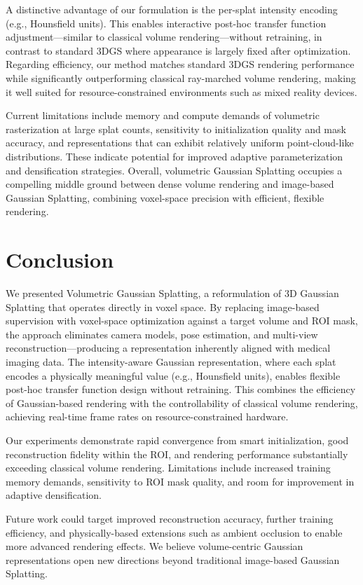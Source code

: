 \documentclass[runningheads]{llncs}
\begin{document}
A distinctive advantage of our formulation is the per-splat intensity encoding (e.g., Hounsfield units). This enables interactive post-hoc transfer function adjustment—similar to classical volume rendering—without retraining, in contrast to standard 3DGS where appearance is largely fixed after optimization. Regarding efficiency, our method matches standard 3DGS rendering performance while significantly outperforming classical ray-marched volume rendering, making it well suited for resource-constrained environments such as mixed reality devices.

Current limitations include memory and compute demands of volumetric rasterization at large splat counts, sensitivity to initialization quality and mask accuracy, and representations that can exhibit relatively uniform point-cloud-like distributions. These indicate potential for improved adaptive parameterization and densification strategies. Overall, volumetric Gaussian Splatting occupies a compelling middle ground between dense volume rendering and image-based Gaussian Splatting, combining voxel-space precision with efficient, flexible rendering.

\section{Conclusion}

We presented Volumetric Gaussian Splatting, a reformulation of 3D Gaussian Splatting that operates directly in voxel space. By replacing image-based supervision with voxel-space optimization against a target volume and ROI mask, the approach eliminates camera models, pose estimation, and multi-view reconstruction—producing a representation inherently aligned with medical imaging data. The intensity-aware Gaussian representation, where each splat encodes a physically meaningful value (e.g., Hounsfield units), enables flexible post-hoc transfer function design without retraining. This combines the efficiency of Gaussian-based rendering with the controllability of classical volume rendering, achieving real-time frame rates on resource-constrained hardware.

Our experiments demonstrate rapid convergence from smart initialization, good reconstruction fidelity within the ROI, and rendering performance substantially exceeding classical volume rendering. Limitations include increased training memory demands, sensitivity to ROI mask quality, and room for improvement in adaptive densification.

Future work could target improved reconstruction accuracy, further training efficiency, and physically-based extensions such as ambient occlusion to enable more advanced rendering effects. We believe volume-centric Gaussian representations open new directions beyond traditional image-based Gaussian Splatting.
\end{document}
